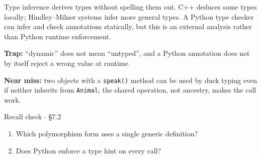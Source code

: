 \documentclass[11pt]{article}
\begin{document}
\begin{keepsection}
Type inference derives types without spelling them out. C++ deduces some types locally; Hindley–Milner systems infer more general types. A Python type checker can infer and check annotations statically, but this is an external analysis rather than Python runtime enforcement.

\begin{notebox}\textbf{Trap:} “dynamic” does not mean “untyped”, and a Python annotation does not by itself reject a wrong value at runtime.\end{notebox}

\begin{notebox}\textbf{Near miss:} two objects with a \texttt{speak()} method can be used by duck typing even if neither inherits from \texttt{Animal}; the shared operation, not ancestry, makes the call work.\end{notebox}

\begin{recallbox}{Recall check \ensuremath{\cdot} §7.2}
\begin{enumerate}
\item Which polymorphism form uses a single generic definition?
\item Does Python enforce a type hint on every call?
\end{enumerate}

\end{recallbox}
\end{keepsection}
\end{document}
